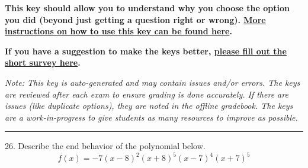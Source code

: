 \documentclass{article}[14pt]
\begin{document}
\textbf{This key should allow you to understand why you choose the option you did (beyond just getting a question right or wrong). \href{https://xronos.clas.ufl.edu/mac1105spring2020/courseDescriptionAndMisc/Exams/LearningFromResults}{More instructions on how to use this key can be found here}.}

\textbf{If you have a suggestion to make the keys better, \href{https://forms.gle/CZkbZmPbC9XALEE88}{please fill out the short survey here}.}

\textit{Note: This key is auto-generated and may contain issues and/or errors. The keys are reviewed after each exam to ensure grading is done accurately. If there are issues (like duplicate options), they are noted in the offline gradebook. The keys are a work-in-progress to give students as many resources to improve as possible.}

\rule{\textwidth}{0.4pt}

26. Describe the end behavior of the polynomial below.
$$ f(x) = -7(x - 8)^{2}(x + 8)^{5}(x - 7)^{4}(x + 7)^{5} $$ 
\end{document}
